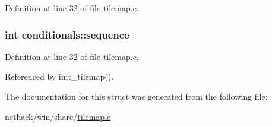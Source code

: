 Definition at line 32 of file tilemap.\+c.

\hypertarget{structconditionals_a2da053b05811269cbffbec11dedd4526}{
\subsubsection[{sequence}]{\setlength{\rightskip}{0pt plus 5cm}int conditionals\+::sequence}}\label{structconditionals_a2da053b05811269cbffbec11dedd4526}


Definition at line 32 of file tilemap.\+c.



Referenced by init\+\_\+tilemap().



The documentation for this struct was generated from the following file\+:\begin{DoxyCompactItemize}
\item 
nethack/win/share/\hyperlink{tilemap_8c}{tilemap.\+c}\end{DoxyCompactItemize}
